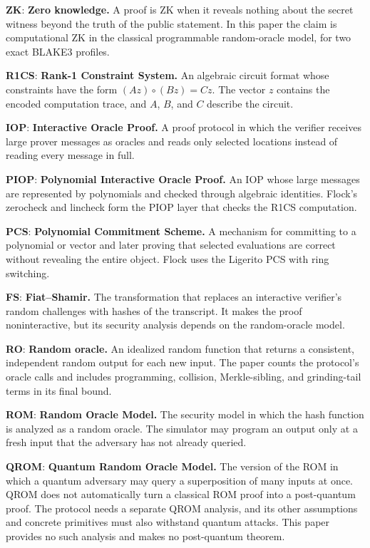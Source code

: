 \documentclass[11pt]{article}
\newcommand{\term}[2]{\textbf{#1}: \textbf{#2}}
\begin{document}
\term{ZK}{Zero knowledge.}
A proof is ZK when it reveals nothing about the secret witness beyond the
truth of the public statement. In this paper the claim is computational ZK in
the classical programmable random-oracle model, for two exact BLAKE3 profiles.

\term{R1CS}{Rank-1 Constraint System.}
An algebraic circuit format whose constraints have the form
$(Az)\circ(Bz)=Cz$. The vector $z$ contains the encoded computation trace, and
$A$, $B$, and $C$ describe the circuit.

\term{IOP}{Interactive Oracle Proof.}
A proof protocol in which the verifier receives large prover messages as
oracles and reads only selected locations instead of reading every message in
full.

\term{PIOP}{Polynomial Interactive Oracle Proof.}
An IOP whose large messages are represented by polynomials and checked through
algebraic identities. Flock's zerocheck and lincheck form the PIOP layer that
checks the R1CS computation.

\term{PCS}{Polynomial Commitment Scheme.}
A mechanism for committing to a polynomial or vector and later proving that
selected evaluations are correct without revealing the entire object. Flock
uses the Ligerito PCS with ring switching.

\term{FS}{Fiat--Shamir.}
The transformation that replaces an interactive verifier's random challenges
with hashes of the transcript. It makes the proof noninteractive, but its
security analysis depends on the random-oracle model.

\term{RO}{Random oracle.}
An idealized random function that returns a consistent, independent random
output for each new input. The paper counts the protocol's oracle calls and
includes programming, collision, Merkle-sibling, and grinding-tail terms in its
final bound.

\term{ROM}{Random Oracle Model.}
The security model in which the hash function is analyzed as a random oracle.
The simulator may program an output only at a fresh input that the adversary
has not already queried.

\term{QROM}{Quantum Random Oracle Model.}
The version of the ROM in which a quantum adversary may query a superposition
of many inputs at once. QROM does not automatically turn a classical ROM proof
into a post-quantum proof. The protocol needs a separate QROM analysis, and its
other assumptions and concrete primitives must also withstand quantum attacks.
This paper provides no such analysis and makes no post-quantum theorem.
\end{document}
